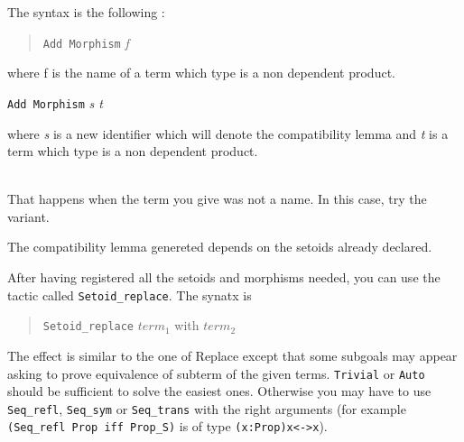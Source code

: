 The syntax is the following :
\begin{quotation}
  \texttt{Add Morphism} \textit{ f}
\end{quotation}

\noindent where f is the name of a term which type is a non dependent
product.

\begin{Variants}
\item \texttt{Add Morphism} \textit{ s t} 
\end{Variants}

\noindent where \textit{s} is a new identifier which will denote the
compatibility lemma and \textit{t} is a term which type is a non
dependent product.

\begin{ErrMsgs}
\item {}\\
That happens when the term you give was not a name. In this case, try
the variant.
\item {}
\item {}
\item {}
\end{ErrMsgs}

The compatibility lemma genereted depends on the setoids already
declared.


After having registered all the setoids and morphisms needed, you can
use the tactic called \texttt{Setoid\_replace}. The synatx is

\begin{quotation}
\texttt{Setoid\_replace} $ term_1$ with $term_2$
\end{quotation}

The effect is similar to the one of Replace except that some subgoals
may appear asking to prove equivalence of subterm of the given terms.
\texttt{Trivial} or \texttt{Auto} should be sufficient to solve the
easiest ones. Otherwise you may have to use \verb+Seq_refl+,
\verb+Seq_sym+ or \verb+Seq_trans+ with the right arguments (for
example \verb+(Seq_refl Prop iff Prop_S)+ is of type
\verb+(x:Prop)x<->x+).
